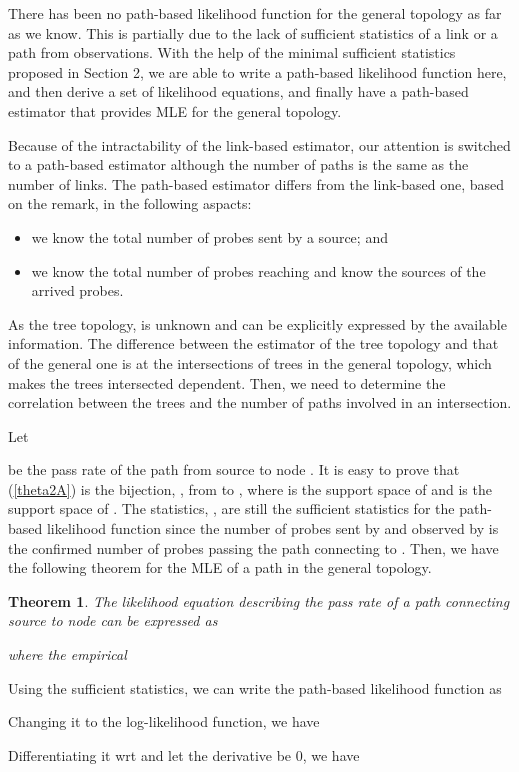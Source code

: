 \documentclass[10pt,twocolumn]{IEEEtran}
\newtheorem{theorem}{\hspace*{1pc}Theorem}
\begin{document}
There has been no path-based likelihood function for the general
topology as far as we know. This is partially due to the lack of
sufficient statistics of a link or a path from observations. With the
help of the minimal sufficient statistics proposed in Section 2, we
are able to write a path-based likelihood function here, and then
derive a set of likelihood equations, and finally have a path-based
estimator that provides MLE for the general topology.

Because of the intractability of the link-based estimator, our
attention is switched to a path-based estimator although the number of
paths is the same as the number of links. The path-based estimator
differs from the link-based one, based on the remark, in the following
aspacts:

\begin{itemize}
\item we know the total number of probes sent by a source; and
\item we know the total number of probes reaching  and know the sources of the arrived
probes.
\end{itemize}
\noindent As the tree topology,  is unknown and can be
explicitly expressed by the available information. The difference
between the estimator of the tree topology and that of the general one
is at the intersections of trees in the general topology, which makes
the trees intersected dependent. Then, we need to determine the
correlation between the trees and the number of paths involved in an
intersection.

 Let


 \noindent be the pass rate of
the path from source  to node . It is easy to prove that
(\ref{theta2A}) is the bijection, , from  to ,
where  is the support space of  and 
is the support space of .
The statistics, , are still the
sufficient statistics for the path-based likelihood function since the
number of probes sent by  and observed by  is the confirmed
number of probes passing the path connecting  to . Then, we have
the following theorem for the MLE of a path in the general topology.

\begin{theorem} \label{general MLE}
The likelihood equation describing the pass rate of a path connecting
source  to node  can be expressed as

where the empirical 
\end{theorem}
\begin{IEEEproof}
Using the sufficient statistics, we can write the path-based
likelihood function as




\noindent Changing it to the log-likelihood function, we have



\noindent Differentiating it wrt  and let the derivative be 0,
we have


\end{IEEEproof}
\end{document}
